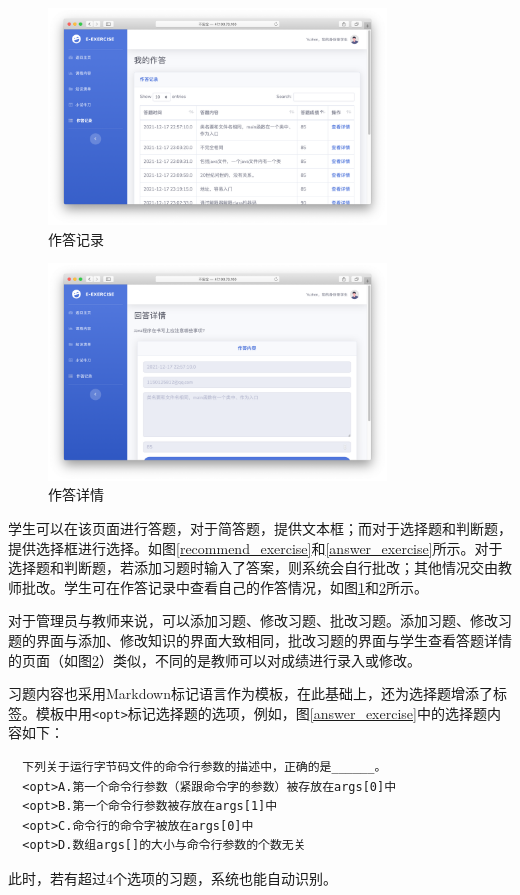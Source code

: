 \documentclass{nwafucoursepaper}
\begin{document}
\begin{figure}[htp]
  \centering
  \includegraphics[width=0.8\textwidth]{answer_record.png}
  \caption{作答记录}
  \label{answer_record}
\end{figure}

\begin{figure}[htp]
  \centering
  \includegraphics[width=0.8\textwidth]{answer_detail.png}
  \caption{作答详情}
  \label{answer_detail}
\end{figure}

学生可以在该页面进行答题，对于简答题，提供文本框；而对于选择题和判断题，提供选择框进行选择。如图\ref{recommend_exercise}和\ref{answer_exercise}所示。对于选择题和判断题，若添加习题时输入了答案，则系统会自行批改；其他情况交由教师批改。学生可在作答记录中查看自己的作答情况，如图\ref{answer_record}和\ref{answer_detail}所示。

对于管理员与教师来说，可以添加习题、修改习题、批改习题。添加习题、修改习题的界面与添加、修改知识的界面大致相同，批改习题的界面与学生查看答题详情的页面（如图\ref{answer_detail}）类似，不同的是教师可以对成绩进行录入或修改。

习题内容也采用Markdown标记语言作为模板，在此基础上，还为选择题增添了标签。模板中用\verb|<opt>|标记选择题的选项，例如，图\ref{answer_exercise}中的选择题内容如下：
\begin{lstlisting}
  下列关于运行字节码文件的命令行参数的描述中，正确的是______。
  <opt>A.第一个命令行参数（紧跟命令字的参数）被存放在args[0]中
  <opt>B.第一个命令行参数被存放在args[1]中
  <opt>C.命令行的命令字被放在args[0]中
  <opt>D.数组args[]的大小与命令行参数的个数无关
\end{lstlisting}
此时，若有超过4个选项的习题，系统也能自动识别。
\end{document}
